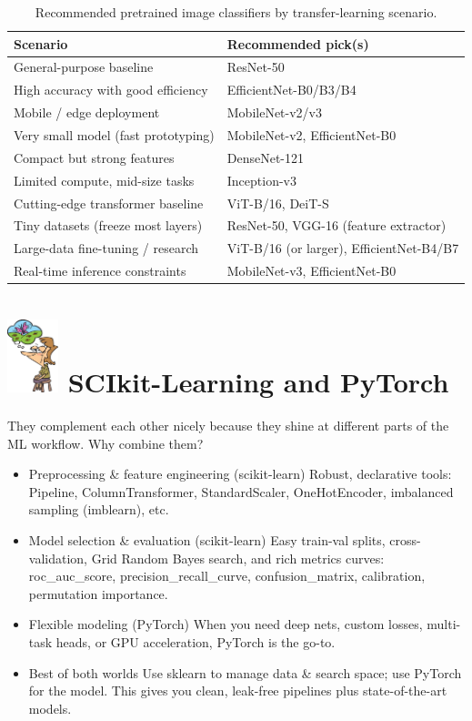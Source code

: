\documentclass{article}
\begin{document}
\begin{table}[h!]
    \centering
    \caption{Recommended pretrained image classifiers by transfer-learning scenario.}
    \renewcommand{\arraystretch}{1.2}
    \begin{tabularx}{\textwidth}{@{}lX@{}}
    \toprule
    \textbf{Scenario} & \textbf{Recommended pick(s)} \\
    \midrule
    General-purpose baseline & ResNet-50 \\
    High accuracy with good efficiency & EfficientNet-B0/B3/B4 \\
    Mobile / edge deployment & MobileNet-v2/v3 \\
    Very small model (fast prototyping) & MobileNet-v2, EfficientNet-B0 \\
    Compact but strong features & DenseNet-121 \\
    Limited compute, mid-size tasks & Inception-v3 \\
    Cutting-edge transformer baseline & ViT-B/16, DeiT-S \\
    Tiny datasets (freeze most layers) & ResNet-50, VGG-16 (feature extractor) \\
    Large-data fine-tuning / research & ViT-B/16 (or larger), EfficientNet-B4/B7 \\
    Real-time inference constraints & MobileNet-v3, EfficientNet-B0 \\
    \bottomrule
    \end{tabularx}
    \end{table}



    \section{ \includegraphics[width=2em]{memory.jpeg} SCIkit-Learning and PyTorch}
    They complement each other nicely because they shine at different parts of the ML workflow.
Why combine them?
\begin{itemize}
    \item Preprocessing \& feature engineering (scikit-learn)
    Robust, declarative tools: Pipeline, ColumnTransformer, StandardScaler, OneHotEncoder, imbalanced sampling (imblearn), etc.
    \item Model selection \& evaluation (scikit-learn)
    Easy train-val splits, cross-validation, Grid Random Bayes search, and rich metrics curves: roc\_auc\_score, precision\_recall\_curve, confusion\_matrix, calibration, permutation importance.
    \item Flexible modeling (PyTorch)
    When you need deep nets, custom losses, multi-task heads, or GPU acceleration, PyTorch is the go-to.
    \item Best of both worlds
    Use sklearn to manage data \& search space; use PyTorch for the model. This gives you clean, leak-free pipelines plus state-of-the-art models.
    
\end{itemize}
\end{document}

